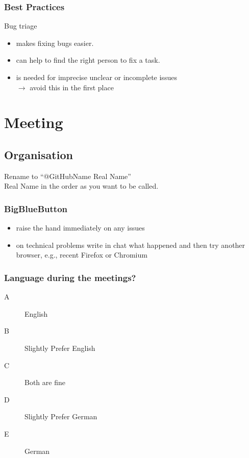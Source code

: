 \begin{frame}
	\frametitle{Best Practices}

	Bug triage
	\begin{itemize}
		\item makes fixing bugs easier.
		\item can help to find the right person to fix a task.
		\item is needed for imprecise unclear or incomplete issues \\
			$\rightarrow$ avoid this in the first place
	\end{itemize}
\end{frame}

\section{Meeting}

\subsection{Organisation}


\begin{frame}
	\begin{task}
	Rename to ``@GitHubName Real Name'' \\
	Real Name in the order as you want to be called.
	\end{task}

	\frametitle{BigBlueButton}
	\begin{itemize}
		\item raise the hand immediately on any issues
		\item on technical problems write in chat what happened and then try another browser, e.g., recent Firefox or Chromium
	\end{itemize}
\end{frame}

\begin{assignment}
	\frametitle{Language during the meetings?}
	\begin{task}
	\begin{description}
	\item[A] English
	\item[B] Slightly Prefer English
	\item[C] Both are fine
	\item[D] Slightly Prefer German
	\item[E] German
	\end{description}
	\end{task}
\end{assignment}

